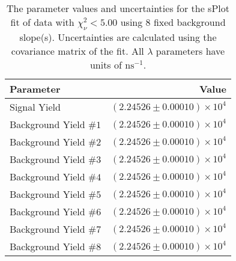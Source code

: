 
\begin{table}
    \begin{center}
        \begin{tabular}{lr}\toprule
            Parameter & Value \\\midrule
            Signal Yield & $(2.24526 \pm 0.00010) \times 10^{4}$ \\
            Background Yield $\#1$ & $(2.24526 \pm 0.00010) \times 10^{4}$ \\
            Background Yield $\#2$ & $(2.24526 \pm 0.00010) \times 10^{4}$ \\
            Background Yield $\#3$ & $(2.24526 \pm 0.00010) \times 10^{4}$ \\
            Background Yield $\#4$ & $(2.24526 \pm 0.00010) \times 10^{4}$ \\
            Background Yield $\#5$ & $(2.24526 \pm 0.00010) \times 10^{4}$ \\
            Background Yield $\#6$ & $(2.24526 \pm 0.00010) \times 10^{4}$ \\
            Background Yield $\#7$ & $(2.24526 \pm 0.00010) \times 10^{4}$ \\
            Background Yield $\#8$ & $(2.24526 \pm 0.00010) \times 10^{4}$ \\\bottomrule
        \end{tabular}
        \caption{The parameter values and uncertainties for the sPlot fit of data with $\chi^2_\nu < 5.00$ using 8 fixed background slope(s). Uncertainties are calculated using the covariance matrix of the fit. All $\lambda$ parameters have units of $\si{\nano\second}^{-1}$.}
    \end{center}
\end{table}
